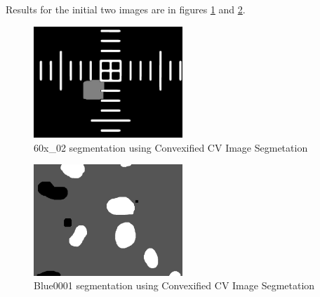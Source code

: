 \documentclass{article}
\begin{document}
Results for the initial two images are in figures \ref{fig:gc2_1} and \ref{fig:gc2_2}.

\pagebreak
\begin{figure}
\centering
\includegraphics[width=0.5\textwidth]{figures/60x_02_gc2.png}
\caption{60x\_02 segmentation using Convexified CV Image Segmetation}
\label{fig:gc2_1}
\end{figure}

\begin{figure}
\centering
\includegraphics[width=0.5\textwidth]{figures/Blue0001_gc2.png}
\caption{Blue0001 segmentation using Convexified CV Image Segmetation}
\label{fig:gc2_2}
\end{figure}











\pagebreak
\end{document}
